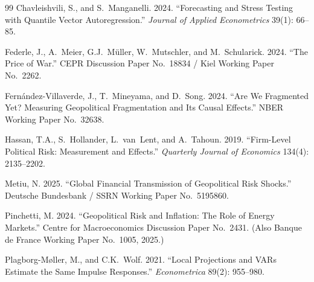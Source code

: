 \documentclass[12pt]{article}
\begin{document}
\begin{thebibliography}{99}
Chavleishvili, S., and S.~Manganelli. 2024.
``Forecasting and Stress Testing with Quantile Vector Autoregression.''
\textit{Journal of Applied Econometrics} 39(1): 66--85.

Federle, J., A.~Meier, G.J.~M\"{u}ller, W.~Mutschler, and M.~Schularick. 2024.
``The Price of War.''
CEPR Discussion Paper No.~18834 / Kiel Working Paper No.~2262.

Fern\'{a}ndez-Villaverde, J., T.~Mineyama, and D.~Song. 2024.
``Are We Fragmented Yet? Measuring Geopolitical Fragmentation and Its
Causal Effects.'' NBER Working Paper No.~32638.

Hassan, T.A., S.~Hollander, L.~van~Lent, and A.~Tahoun. 2019.
``Firm-Level Political Risk: Measurement and Effects.''
\textit{Quarterly Journal of Economics} 134(4): 2135--2202.

Metiu, N. 2025.
``Global Financial Transmission of Geopolitical Risk Shocks.''
Deutsche Bundesbank / SSRN Working Paper No.~5195860.

Pinchetti, M. 2024.
``Geopolitical Risk and Inflation: The Role of Energy Markets.''
Centre for Macroeconomics Discussion Paper No.~2431.
(Also Banque de France Working Paper No.~1005, 2025.)

Plagborg-M{\o}ller, M., and C.K.~Wolf. 2021.
``Local Projections and VARs Estimate the Same Impulse Responses.''
\textit{Econometrica} 89(2): 955--980.

\end{thebibliography}
\end{document}
